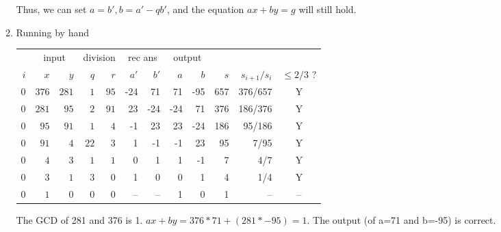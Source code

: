 \documentclass{article}
\begin{document}
\begin{enumerate}
\begin{enumerate}
        Thus, we can set $a = b', b = a' - q b'$, and the equation $ax+by=g$ will still hold.
        
        \hfill \break


        \item Running by hand \\
        \begin{table}[H]\centering
        \begin{tabular}{r|rr|rr|rr|rr|rrc}
            & \multicolumn{2}{c|}{input} & \multicolumn{2}{|c|}{division} & \multicolumn{2}{|c|}{rec ans} & \multicolumn{2}{|c|}{output} \\
            $i$ & $x$   & $y$  & $q$ & $r$  & $a'$ & $b'$ & $a$ & $b$ & $s$ & $s_{i+1}/s_{i}$ & $\leq 2/3$ ? \\ \hline
            $0$ & $376$ & $281$ & $1$ & $95$ & -24 & 71 & 71 & -95 & 657 & 376/657 & Y \\
            $0$ & $281$ & $95$ & $2$ & $91$ & 23 & -24 & -24 & 71 & 376 & 186/376 & Y \\
            $0$ & $95$ & $91$ & $1$ & $4$ & -1 & 23 & 23 & -24 & 186 & 95/186 & Y \\
            $0$ & $91$ & $4$ & $22$ & $3$ & 1 & -1 & -1 & 23 & 95 & 7/95 & Y \\
            $0$ & $4$ & $3$ & $1$ & $1$ & 0 & 1 & 1 & -1 & 7 & 4/7 & Y \\
            $0$ & $3$ & $1$ & $3$ & $0$ & 1 & 0 & 0 & 1 & 4 & 1/4 & Y \\
            $0$ & $1$ & $0$ & $0$ & $0$ & -- & -- & 1 & 0 & 1 & -- & -- \\
        \end{tabular}
        \end{table}

        The GCD of 281 and 376 is 1. $ax+by=376*71+(281*-95)=1$. The output (of a=71 and b=-95) is correct.

    \end{enumerate}
\end{enumerate}
\end{document}
